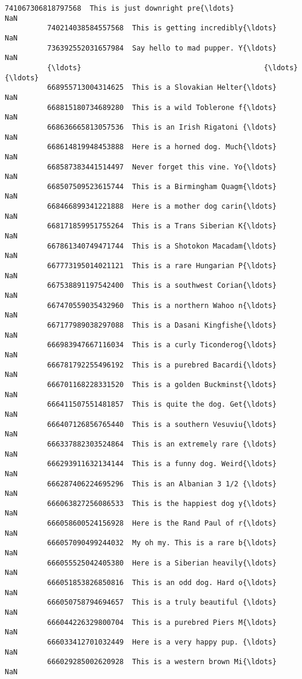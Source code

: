 \documentclass[11pt]{article}
\begin{document}
\begin{Verbatim}[commandchars=\\\{\}]
          741067306818797568  This is just downright pre{\ldots}                    NaN   
          740214038584557568  This is getting incredibly{\ldots}                    NaN   
          736392552031657984  Say hello to mad pupper. Y{\ldots}                    NaN   
          {\ldots}                                           {\ldots}                    {\ldots}   
          668955713004314625  This is a Slovakian Helter{\ldots}                    NaN   
          668815180734689280  This is a wild Toblerone f{\ldots}                    NaN   
          668636665813057536  This is an Irish Rigatoni {\ldots}                    NaN   
          668614819948453888  Here is a horned dog. Much{\ldots}                    NaN   
          668587383441514497  Never forget this vine. Yo{\ldots}                    NaN   
          668507509523615744  This is a Birmingham Quagm{\ldots}                    NaN   
          668466899341221888  Here is a mother dog carin{\ldots}                    NaN   
          668171859951755264  This is a Trans Siberian K{\ldots}                    NaN   
          667861340749471744  This is a Shotokon Macadam{\ldots}                    NaN   
          667773195014021121  This is a rare Hungarian P{\ldots}                    NaN   
          667538891197542400  This is a southwest Corian{\ldots}                    NaN   
          667470559035432960  This is a northern Wahoo n{\ldots}                    NaN   
          667177989038297088  This is a Dasani Kingfishe{\ldots}                    NaN   
          666983947667116034  This is a curly Ticonderog{\ldots}                    NaN   
          666781792255496192  This is a purebred Bacardi{\ldots}                    NaN   
          666701168228331520  This is a golden Buckminst{\ldots}                    NaN   
          666411507551481857  This is quite the dog. Get{\ldots}                    NaN   
          666407126856765440  This is a southern Vesuviu{\ldots}                    NaN   
          666337882303524864  This is an extremely rare {\ldots}                    NaN   
          666293911632134144  This is a funny dog. Weird{\ldots}                    NaN   
          666287406224695296  This is an Albanian 3 1/2 {\ldots}                    NaN   
          666063827256086533  This is the happiest dog y{\ldots}                    NaN   
          666058600524156928  Here is the Rand Paul of r{\ldots}                    NaN   
          666057090499244032  My oh my. This is a rare b{\ldots}                    NaN   
          666055525042405380  Here is a Siberian heavily{\ldots}                    NaN   
          666051853826850816  This is an odd dog. Hard o{\ldots}                    NaN   
          666050758794694657  This is a truly beautiful {\ldots}                    NaN   
          666044226329800704  This is a purebred Piers M{\ldots}                    NaN   
          666033412701032449  Here is a very happy pup. {\ldots}                    NaN   
          666029285002620928  This is a western brown Mi{\ldots}                    NaN   
          

\end{Verbatim}
\end{document}

